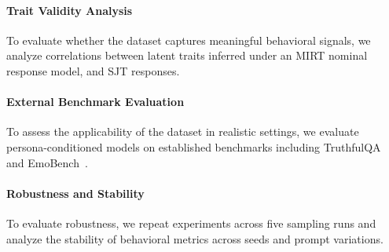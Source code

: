 \documentclass[11pt]{article}
\begin{document}
\paragraph{Trait Validity Analysis}

To evaluate whether the dataset captures meaningful behavioral signals, we analyze correlations between latent traits inferred under an MIRT nominal response model, and SJT responses.

\paragraph{External Benchmark Evaluation}

To assess the applicability of the dataset in realistic settings, we evaluate persona-conditioned models on established benchmarks including TruthfulQA~\citep{truthfulqa} and EmoBench~\citep{emobench}.

\paragraph{Robustness and Stability}
To evaluate robustness, we repeat experiments across five sampling runs and analyze the stability of behavioral metrics across seeds and prompt variations. 


\end{document}
